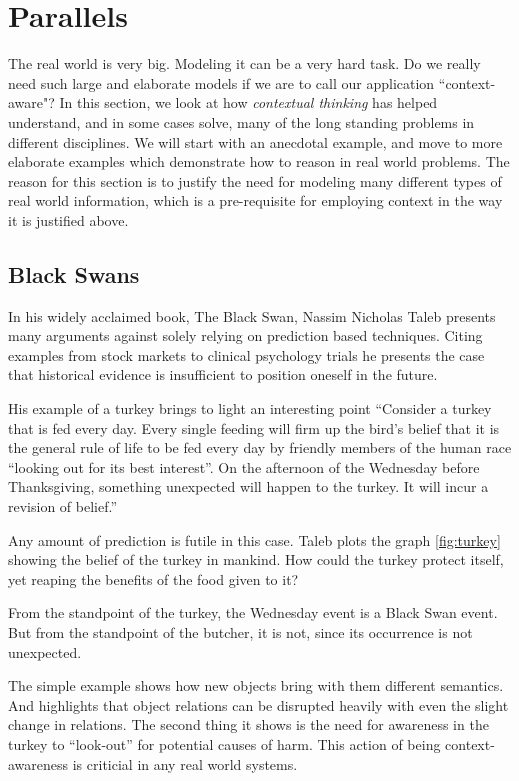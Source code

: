 \section{Parallels}
The real world is very big. Modeling it can be a very hard task. Do we really need such large and elaborate models if we are to call our application ``context-aware"? In this section, we look at how \textit{contextual thinking} has helped understand, and in some cases solve, many of the long standing problems in different disciplines. We will start with an anecdotal example, and move to more elaborate examples which demonstrate how to reason in real world problems. The reason for this section is to justify the need for modeling many different types of real world information, which is a pre-requisite for employing context in the way it is justified above. 

\subsection{Black Swans}
In his widely acclaimed book, The Black Swan, Nassim Nicholas Taleb presents many arguments against solely relying on prediction based techniques. Citing examples from stock markets to clinical psychology trials he presents the case that historical evidence is insufficient to position oneself in the future. 

His example of a turkey brings to light an interesting point ``Consider a turkey that is fed every day. Every single feeding will firm up the bird's belief that it is the general rule of life to be fed every day by friendly members of the human race ``looking out for its best interest''. On the afternoon of the Wednesday before Thanksgiving, something unexpected will happen to the turkey. It will incur a revision of belief.''

Any amount of prediction is futile in this case. Taleb plots the graph \ref{fig:turkey} showing the belief of the turkey in mankind. How could the turkey protect itself, yet reaping the benefits of the food given to it? 

From the standpoint of the turkey, the Wednesday event is a Black Swan event. But from the standpoint of the butcher, it is not, since its occurrence is not unexpected.

The simple example shows how new objects bring with them different semantics. And highlights that object relations can be disrupted heavily with even the slight change in relations. The second thing it shows is the need for awareness in the turkey to ``look-out'' for potential causes of harm. This action of being context-awareness is criticial in any real world systems.

